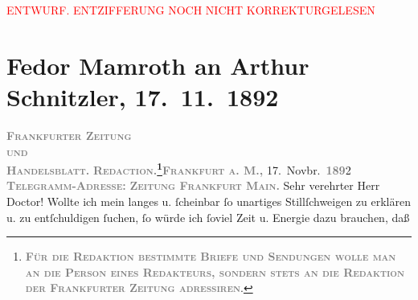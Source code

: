 
\begin{center}
            \textcolor{red}{ENTWURF. ENTZIFFERUNG NOCH NICHT KORREKTURGELESEN}
                      \end{center}
            
               \section[Fedor Mamroth an Arthur Schnitzler, 17. 11. 1892]{ Fedor Mamroth an Arthur Schnitzler, 17. 11. 1892}\nopagebreak{}\rehead{ }\begin{ledgroupsized}[t]{13cm}\normalsize\beginnumbering{} \toendnotes[C]{\smallbreak\pagebreak[2]} 
\toendnotes[C]{\smallbreak}\pstart
           \noindent{}{\pb}\textcolor{gray}{\textbf{\textsc{Frankfurter Zeitung}}}{\\}\textsc{\textcolor{gray}{\textbf{und}}}{\\}\textcolor{gray}{\textbf{\textsc{Handelsblatt.}}}\pend
           \pstart
           \textcolor{gray}{\textbf{\textsc{Redaction.\footnote{\noindent{}\textcolor{gray}{\textbf{\textsc{Für die Redaktion bestimmte
                                                  Briefe und Sendungen wolle man  an die Person eines
                                                  Redakteurs, sondern stets \textbf{an die
                                                  Redaktion der Frankfurter Zeitung}
                                                  adressiren}}}.}}}}\hfill \textcolor{gray}{\textbf{\textsc{Frankfurt a. M.,}}}{ }17. Novbr. \textsc{\textcolor{gray}{\textbf{189}}}2\pend
           \pstart
           \textcolor{gray}{\textbf{\textsc{Telegramm-Adresse:}}}\pend
           \pstart
           \textcolor{gray}{\textbf{\textsc{Zeitung Frankfurt Main.}}}\pend
           \pstart{}Sehr verehrter Herr Doctor!\pend\pstart
           Wollte ich mein langes u. ſcheinbar ſo unartiges Stillſchweigen zu erklären u. zu
                    entſchuldigen ſuchen, ſo würde ich ſoviel Zeit u. Energie dazu brauchen, daß

\end{ledgroupsized}
